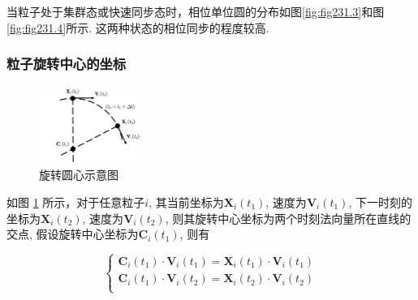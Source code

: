 \documentclass{article}
\begin{document}
当粒子处于集群态或快速同步态时，相位单位圆的分布如图\ref{fig:fig231.3}和图\ref{fig:fig231.4}所示. 这两种状态的相位同步的程度较高.

\newpage
\subsubsection{粒子旋转中心的坐标}

\begin{figure}[H]
	\centering
	\includegraphics[width=0.3\textwidth]{./figs/CenterEps.pdf}
	\vspace{-0.2cm}
	\caption{旋转圆心示意图}
	\label{fig:fig232.1}
\end{figure}

如图 \ref{fig:fig232.1} 所示，对于任意粒子$i$, 其当前坐标为$\mathbf{X}_i\left( t_1 \right)$, 速度为$\mathbf{V}_i\left( t_1 \right)$, 下一时刻的坐标为$\mathbf{X}_i\left( t_2 \right)$, 速度为$\mathbf{V}_i\left( t_2 \right)$, 则其旋转中心坐标为两个时刻法向量所在直线的交点, 假设旋转中心坐标为$\mathbf{C}_i\left( t_1 \right)$, 则有

\vspace{-0.5cm}

$$
\begin{cases}
	\mathbf{C}_i\left( t_1 \right) \cdot \mathbf{V}_i\left( t_1 \right) =\mathbf{X}_i\left( t_1 \right) \cdot \mathbf{V}_i\left( t_1 \right) \\
	\mathbf{C}_i\left( t_1 \right) \cdot \mathbf{V}_i\left( t_2 \right) =\mathbf{X}_i\left( t_2 \right) \cdot \mathbf{V}_i\left( t_2 \right) \\
\end{cases}
$$


\end{document}
